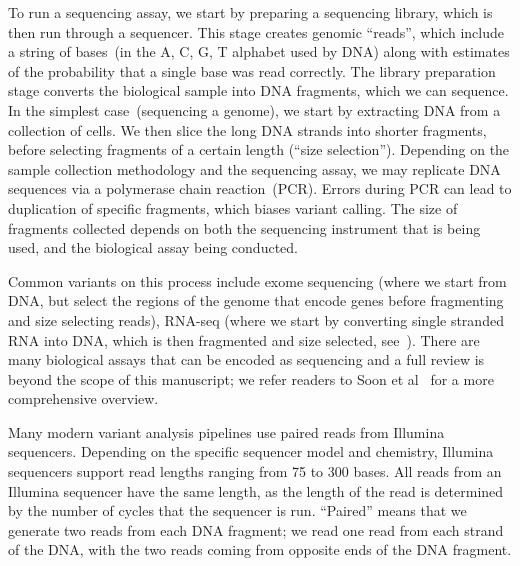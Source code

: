 \documentclass[phd]{ucbthesis}
\begin{document}
To run a sequencing assay, we start by preparing a sequencing library, which is
then run through a sequencer. This stage creates genomic ``reads'', which
include a string of bases~(in the A, C, G, T alphabet used by DNA) along with
estimates of the probability that a single base was read correctly. The library
preparation stage converts the biological sample into DNA fragments, which we
can sequence. In the simplest case~(sequencing a genome), we start by extracting
DNA from a collection of cells. We then slice the long DNA strands into shorter
fragments, before selecting fragments of a certain length (``size selection'').
Depending on the sample collection methodology and the sequencing assay, we may
replicate DNA sequences via a polymerase chain reaction~(PCR). Errors during PCR
can lead to duplication of specific fragments, which biases variant calling.
The size of fragments collected depends on both the sequencing instrument that
is being used, and the biological assay being conducted.

Common variants on this
process include exome sequencing (where we start from DNA, but select the regions
of the genome that encode genes before fragmenting and size selecting reads),
RNA-seq (where we start by converting single stranded RNA into DNA, which is
then fragmented and size selected, see~\cite{mortazavi08}). There are many
biological assays that can be encoded as sequencing and a full review is beyond
the scope of this manuscript; we refer readers to Soon et al~\cite{soon13} for a
more comprehensive overview.

Many modern variant analysis pipelines use paired reads from Illumina
sequencers. Depending on the specific sequencer model and chemistry, Illumina
sequencers support read lengths ranging from 75 to 300 bases. All reads from an
Illumina sequencer have the same length, as the length of the read is determined
by the number of cycles that the sequencer is run. ``Paired''  means that we
generate two reads from each DNA fragment; we read one read from each strand of
the DNA, with the two reads coming from opposite ends of the DNA fragment.
\end{document}
